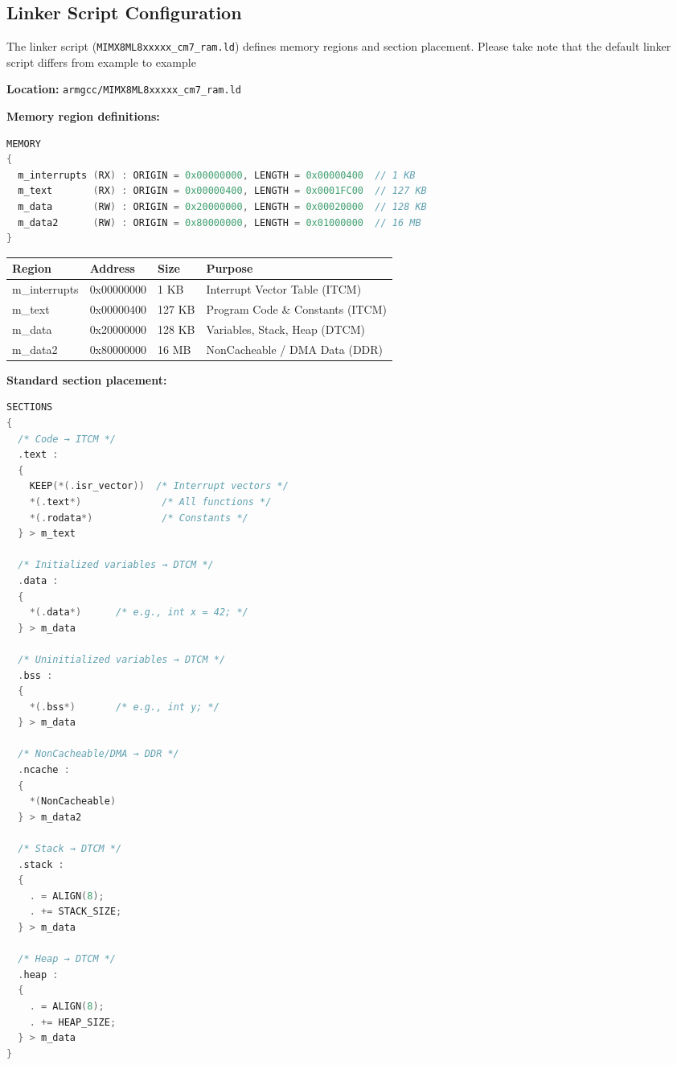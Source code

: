 \documentclass[12pt,a4paper]{report}
\begin{document}
\subsection{Linker Script Configuration}
\label{sec:linker_script}

The linker script (\texttt{MIMX8ML8xxxxx\_cm7\_ram.ld}) defines memory regions and section placement.
Please take note that the default linker script differs from example to example

\textbf{Location:} \texttt{armgcc/MIMX8ML8xxxxx\_cm7\_ram.ld}

\textbf{Memory region definitions:}

\begin{lstlisting}[language=c]
MEMORY
{
  m_interrupts (RX) : ORIGIN = 0x00000000, LENGTH = 0x00000400  // 1 KB
  m_text       (RX) : ORIGIN = 0x00000400, LENGTH = 0x0001FC00  // 127 KB
  m_data       (RW) : ORIGIN = 0x20000000, LENGTH = 0x00020000  // 128 KB
  m_data2      (RW) : ORIGIN = 0x80000000, LENGTH = 0x01000000  // 16 MB
}
\end{lstlisting}

\begin{center}
\begin{tabular}{|l|l|l|p{5cm}|}
\hline
\textbf{Region} & \textbf{Address} & \textbf{Size} & \textbf{Purpose} \\
\hline
m\_interrupts & 0x00000000 & 1 KB & Interrupt Vector Table (ITCM) \\
\hline
m\_text & 0x00000400 & 127 KB & Program Code \& Constants (ITCM) \\
\hline
m\_data & 0x20000000 & 128 KB & Variables, Stack, Heap (DTCM) \\
\hline
m\_data2 & 0x80000000 & 16 MB & NonCacheable / DMA Data (DDR) \\
\hline
\end{tabular}
\end{center}

\textbf{Standard section placement:}

\begin{lstlisting}[language=c]
SECTIONS
{
  /* Code → ITCM */
  .text :
  {
    KEEP(*(.isr_vector))  /* Interrupt vectors */
    *(.text*)              /* All functions */
    *(.rodata*)            /* Constants */
  } > m_text

  /* Initialized variables → DTCM */
  .data :
  {
    *(.data*)      /* e.g., int x = 42; */
  } > m_data

  /* Uninitialized variables → DTCM */
  .bss :
  {
    *(.bss*)       /* e.g., int y; */
  } > m_data

  /* NonCacheable/DMA → DDR */
  .ncache :
  {
    *(NonCacheable)
  } > m_data2

  /* Stack → DTCM */
  .stack :
  {
    . = ALIGN(8);
    . += STACK_SIZE;
  } > m_data

  /* Heap → DTCM */
  .heap :
  {
    . = ALIGN(8);
    . += HEAP_SIZE;
  } > m_data
}
\end{lstlisting}
\end{document}

